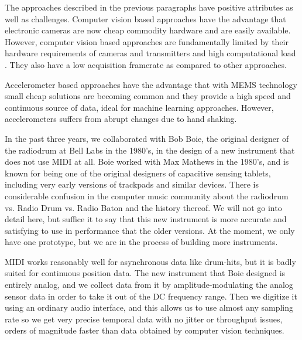 \documentclass[twoside,10pt,a4paper]{article}
\begin{document}
The approaches described in the previous paragraphs have positive
attributes as well as challenges.  Computer vision based approaches
have the advantage that electronic cameras are now cheap commodity
hardware and are easily available.  However, computer vision based
approaches are fundamentally limited by their hardware requirements of
cameras and transmitters and high computational load \cite{liu09}.
They also have a low acquisition framerate as compared to other
approaches.


Accelerometer based approaches have the advantage that with MEMS
technology small cheap solutions are becoming common \cite{wu09} and
they provide a high speed and continuous source of data, ideal for
machine learning approaches.  However, accelerometers suffers from
abrupt changes due to hand shaking\cite{akl10}.

In the past three years, we collaborated with Bob Boie, the original
designer of the radiodrum at Bell Labs in the 1980's, in the design of
a new instrument that does not use MIDI at all.  Boie worked with Max
Mathews in the 1980's, and is known for being one of the original
designers of capacitive sensing tablets, including very early versions
of trackpads and similar devices.  There is considerable confusion in
the computer music community about the radiodrum vs. Radio Drum
vs. Radio Baton and the history thereof.  We will not go into detail
here, but suffice it to say that this new instrument is more accurate
and satisfying to use in performance that the older versions.  At the
moment, we only have one prototype, but we are in the process of
building more instruments.

MIDI works reasonably well for asynchronous data like drum-hits, but
it is badly suited for continuous position data.  The new instrument
that Boie designed is entirely analog, and we collect data from it by
amplitude-modulating the analog sensor data in order to take it out of
the DC frequency range.  Then we digitize it using an ordinary audio
interface, and this allows us to use almost any sampling rate so we
get very precise temporal data with no jitter or throughput issues,
orders of magnitude faster than data obtained by computer vision
techniques.
\end{document}

